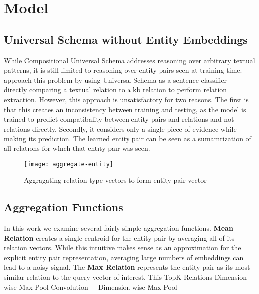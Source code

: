 \section{Model \label{sec:model}}

\subsection {Universal Schema without Entity Embeddings}

While Compositional Universal Schema addresses reasoning over arbitrary textual patterns, it is still limited to reasoning over entity pairs seen at training time.
\citet{verga2015multilingual} approach this problem by using Universal Schema as a sentence classifier - directly comparing a textual relation to a kb relation to perform relation extraction.
However, this approach is unsatisfactory for two reasons.
The first is that this creates an inconsistency between training and testing, as the model is trained to predict compatibality between entity pairs and relations and not relations directly.
Secondly, it considers only a single piece of evidence while making its prediction.
The learned entity pair can be seen as a sumamrization of all relations for which that entity pair was seen.



\begin{figure}[h]
\caption{Aggragating relation type vectors to form entity pair vector}
\centering
\texttt{[image: aggregate-entity]}
\end{figure}


\subsection {Aggregation Functions}
In this work we examine several fairly simple aggregation functions.
\textbf{Mean Relation} creates a single centroid for the entity pair by averaging all of its relation vectors.
While this intuitive makes sense as an approximation for the explicit entity pair representation, averaging large numbers of embeddings can lead to a noisy signal.
The \textbf{Max Relation} represents the entity pair as its most similar relation to the query vector of interest.
This
 TopK Relations
 Dimension-wise Max Pool
   Convolution + Dimension-wise Max Pool
